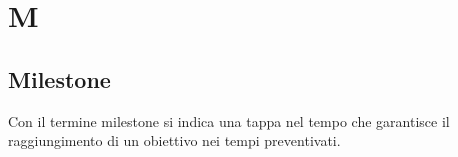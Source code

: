 \section{M}
	\subsection{Milestone}  
		Con il termine milestone si indica una tappa nel tempo che garantisce il raggiungimento di un obiettivo nei tempi preventivati.


\newpage